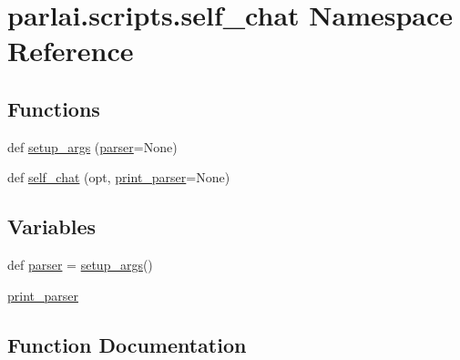 \hypertarget{namespaceparlai_1_1scripts_1_1self__chat}{}\section{parlai.\+scripts.\+self\+\_\+chat Namespace Reference}
\label{namespaceparlai_1_1scripts_1_1self__chat}
\subsection*{Functions}
\begin{DoxyCompactItemize}
\item 
def \hyperlink{namespaceparlai_1_1scripts_1_1self__chat_a0899a6bf4e3d48c81a2c1b97f9696714}{setup\+\_\+args} (\hyperlink{namespaceparlai_1_1scripts_1_1self__chat_aa318de0dcf8e4474b9cc89fb2ed28a80}{parser}=None)
\item 
def \hyperlink{namespaceparlai_1_1scripts_1_1self__chat_a3b20ced8dd92830f75efb0dc18269794}{self\+\_\+chat} (opt, \hyperlink{namespaceparlai_1_1scripts_1_1self__chat_a41f7dd601db93d7b7f5edfa0da0ab336}{print\+\_\+parser}=None)
\end{DoxyCompactItemize}
\subsection*{Variables}
\begin{DoxyCompactItemize}
\item 
def \hyperlink{namespaceparlai_1_1scripts_1_1self__chat_aa318de0dcf8e4474b9cc89fb2ed28a80}{parser} = \hyperlink{namespaceparlai_1_1scripts_1_1self__chat_a0899a6bf4e3d48c81a2c1b97f9696714}{setup\+\_\+args}()
\item 
\hyperlink{namespaceparlai_1_1scripts_1_1self__chat_a41f7dd601db93d7b7f5edfa0da0ab336}{print\+\_\+parser}
\end{DoxyCompactItemize}


\subsection{Function Documentation}
\mbox{\label{namespaceparlai_1_1scripts_1_1self__chat_a3b20ced8dd92830f75efb0dc18269794}} 
